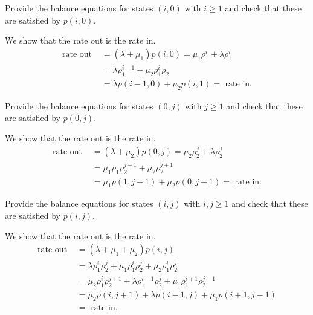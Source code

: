 \begin{extra}
  Provide the balance equations for  states $(i,0)$ with $i\geq 1$ and check that these are satisfied by $p(i,0)$. 
\begin{solution} We show that the rate out is the rate in.
  \begin{align*}
    \text{rate out } &=(\lambda + \mu_1) p(i,0) = \mu_1 \rho_1^i + \lambda \rho_1^i \\
                     &= \lambda \rho_1^{i-1} + \mu_2 \rho_1^i \rho_2 \\
    &= \lambda p(i-1,0) + \mu_2 p(i, 1) = \text{ rate in}.
  \end{align*}
\end{solution}
\end{extra}

\begin{extra}
  Provide the balance equations for states $(0,j)$ with $j\geq 1$ and check that these are satisfied by $p(0, j)$. 
\begin{solution} We show that the rate out is the rate in.
  \begin{align*}
    \text{rate out } &=(\lambda + \mu_2) p(0, j) = \mu_2 \rho_2^j + \lambda \rho_2^j\\
                     &= \mu_1\rho_1 \rho_2^{j-1} + \mu_2 \rho_2^{j+1} \\
    &= \mu_1 p(1,j-1) + \mu_2 p(0, j+1) = \text{ rate in}.
  \end{align*}
\end{solution}
\end{extra}

\begin{extra}
  Provide the balance equations for states $(i,j)$ with $i, j\geq 1$ and check that these are satisfied by $p(i, j)$. 
\begin{solution} We show that the rate out is the rate in.
  \begin{align*}
    \text{rate out } &=(\lambda + \mu_1 + \mu_2) p(i, j) \\
    &= \lambda  \rho_1^i \rho_2^j + \mu_1 \rho_1^{i} \rho_2^j + \mu_2 \rho_1^i\rho_2^j\\
    &=\mu_2 \rho_1^{i} \rho_2^{j+1} + \lambda \rho_1^{i-1} \rho_2^j + \mu_1 \rho_1^{i+1}\rho_2^{j-1}\\
                     &= \mu_2p(i, j+1) + \lambda p(i-1, j) + \mu_1 p(i+1, j-1)\\
    &= \text{ rate in}.
  \end{align*}
\end{solution}
\end{extra}

